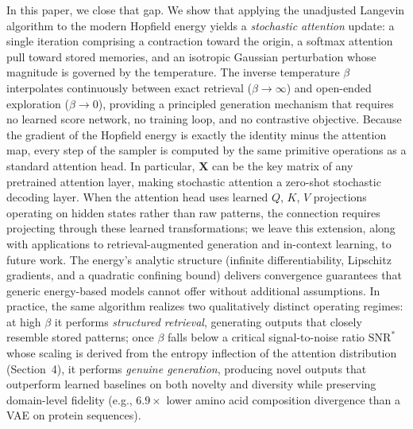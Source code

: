 In this paper, we close that gap. We show that applying the unadjusted Langevin algorithm to the modern Hopfield energy yields a \emph{stochastic attention} update: a single iteration comprising a contraction toward the origin, a softmax attention pull toward stored memories, and an isotropic Gaussian perturbation whose magnitude is governed by the temperature. The inverse temperature $\beta$ interpolates continuously between exact retrieval ($\beta\to\infty$) and open-ended exploration ($\beta\to 0$), providing a principled generation mechanism that requires no learned score network, no training loop, and no contrastive objective. Because the gradient of the Hopfield energy is exactly the identity minus the attention map, every step of the sampler is computed by the same primitive operations as a standard attention head. In particular, $\mathbf{X}$ can be the key matrix of any pretrained attention layer, making stochastic attention a zero-shot stochastic decoding layer. When the attention head uses learned $Q$, $K$, $V$ projections operating on hidden states rather than raw patterns, the connection requires projecting through these learned transformations; we leave this extension, along with applications to retrieval-augmented generation and in-context learning, to future work. The energy's analytic structure (infinite differentiability, Lipschitz gradients, and a quadratic confining bound) delivers convergence guarantees that generic energy-based models cannot offer without additional assumptions. In practice, the same algorithm realizes two qualitatively distinct operating regimes: at high $\beta$ it performs \emph{structured retrieval}, generating outputs that closely resemble stored patterns; once $\beta$ falls below a critical signal-to-noise ratio $\mathrm{SNR}^*$ whose scaling is derived from the entropy inflection of the attention distribution (Section~4), it performs \emph{genuine generation}, producing novel outputs that outperform learned baselines on both novelty and diversity while preserving domain-level fidelity (e.g., $6.9{\times}$ lower amino acid composition divergence than a VAE on protein sequences).

